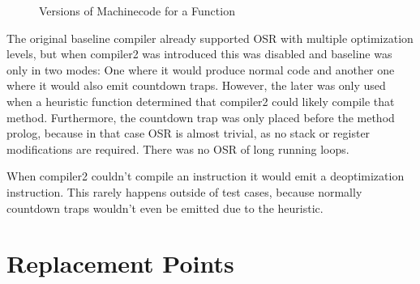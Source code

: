 \documentclass[draft,final]{vutinfth} %
\begin{document}
    \begin{figure}
        \centering
        \caption{Versions of Machinecode for a Function}
        \label{fig:code-versions}
    \end{figure}



    The original baseline compiler already supported OSR with multiple optimization levels,
    but when compiler2 was introduced this was disabled and baseline was only in two modes:
    One where it would produce normal code and another one where it would also emit countdown traps.
    However, the later was only used when a heuristic function determined that compiler2 could likely compile that method.
    Furthermore, the countdown trap was only placed before the method prolog,
    because in that case OSR is almost trivial,
    as no stack or register modifications are required.
    There was no OSR of long running loops.

    When compiler2 couldn't compile an instruction it would emit a deoptimization instruction.
    This rarely happens outside of test cases,
    because normally countdown traps wouldn't even be emitted due to the heuristic.


    \section{Replacement Points}
\end{document}
